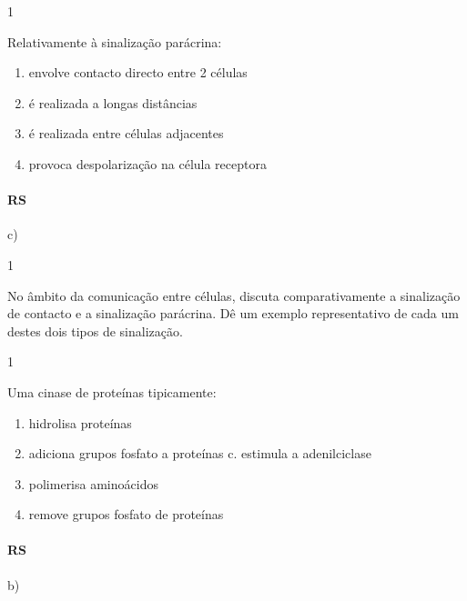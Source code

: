 \documentclass[\mainfilename]{subfiles}
\begin{document}
\begin{questionBox}1{} %
    
    Relativamente à sinalização parácrina:
    \begin{enumerate}[label=\alph{enumi})]
        \item envolve contacto directo entre 2 células
        \item é realizada a longas distâncias
        \item é realizada entre células adjacentes
        \item provoca despolarização na célula receptora
    \end{enumerate}

    \paragraph*{RS} c)
    
\end{questionBox}

\begin{questionBox}1{} %
    
    No âmbito da comunicação entre células, discuta comparativamente a sinalização de contacto e a sinalização parácrina. Dê um exemplo representativo de cada um destes dois tipos de sinalização.
    
\end{questionBox}

\begin{questionBox}1{} %
    
    Uma cinase de proteínas tipicamente:
    \begin{enumerate}[label=\alph{enumi})]
        \item hidrolisa proteínas
        \item adiciona grupos fosfato a proteínas c. estimula a adenilciclase
        \item polimerisa aminoácidos
        \item remove grupos fosfato de proteínas
    \end{enumerate}

    \paragraph*{RS} b)
    
\end{questionBox}
\end{document}
